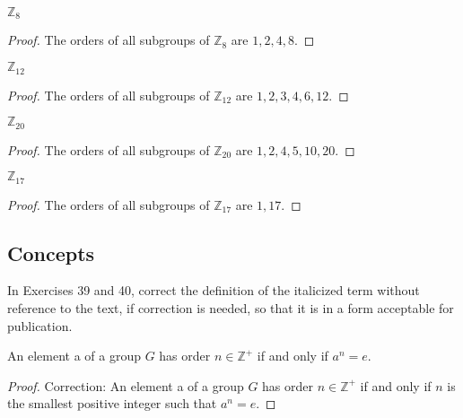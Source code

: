 \newpage
\begin{exercise}
    $\mathbb{Z}_{8}$
\end{exercise}

\begin{proof}
    The orders of all subgroups of $\mathbb{Z}_{8}$ are $1, 2, 4, 8$.
\end{proof}

\newpage
\begin{exercise}
    $\mathbb{Z}_{12}$
\end{exercise}

\begin{proof}
    The orders of all subgroups of $\mathbb{Z}_{12}$ are $1, 2, 3, 4, 6, 12$.
\end{proof}

\newpage
\begin{exercise}
    $\mathbb{Z}_{20}$
\end{exercise}

\begin{proof}
    The orders of all subgroups of $\mathbb{Z}_{20}$ are $1, 2, 4, 5, 10, 20$.
\end{proof}

\newpage
\begin{exercise}
    $\mathbb{Z}_{17}$
\end{exercise}

\begin{proof}
    The orders of all subgroups of $\mathbb{Z}_{17}$ are $1, 17$.
\end{proof}

\subsection*{Concepts}

In Exercises 39 and 40, correct the definition of the italicized term without reference to the text, if correction is needed, so that it is in a form acceptable for publication.

\newpage
\begin{exercise}
    An element a of a group $G$ has order $n\in\mathbb{Z}^{+}$ if and only if $a^{n} = e$.
\end{exercise}

\begin{proof}
    Correction:  An element a of a group $G$ has order $n\in\mathbb{Z}^{+}$ if and only if $n$ is the smallest positive integer such that $a^{n} = e$.
\end{proof}

